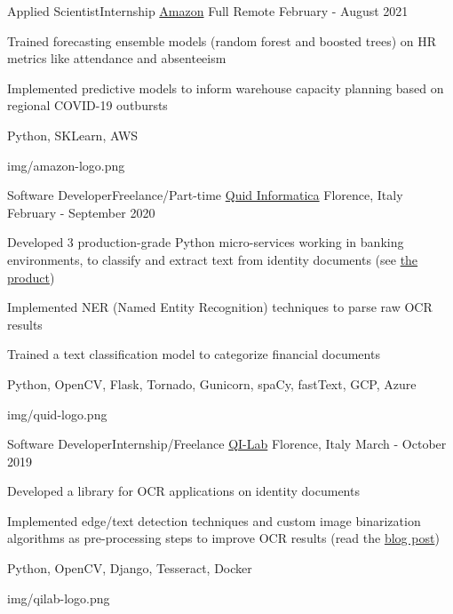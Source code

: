 \begin{cventries}
  \logocventry
    {Applied Scientist{\enskip\cdotp\enskip}Internship}
    {\href{https://www.amazon.com/}{Amazon}}
    {Full Remote}
    {February - August 2021}
    {
      \begin{cvitems}
        \item {Trained forecasting ensemble models (random forest and boosted trees) on HR metrics like attendance and absenteeism}
        \item {Implemented predictive models to inform warehouse capacity planning based on regional COVID-19 outbursts}
      \end{cvitems}
      \cvexptech
        {Python, SKLearn, AWS}
    }
    {img/amazon-logo.png}

  \logocventry
    {Software Developer{\enskip\cdotp\enskip}Freelance/Part-time}
    {\href{https://www.quidinfo.it/}{Quid Informatica}}
    {Florence, Italy}
    {February - September 2020}
    {
      \begin{cvitems}
        \item {Developed 3 production-grade Python micro-services working in banking environments, to classify and extract text from identity documents (see \textcolor{blue}{\href{https://www.youtube.com/watch?v=eyg-UOAdKA8}{the product}})}
        \item {Implemented NER (Named Entity Recognition) techniques to parse raw OCR results}
        \item {Trained a text classification model to categorize financial documents}
      \end{cvitems}
      \cvexptech
        {Python, OpenCV, Flask, Tornado, Gunicorn, spaCy, fastText, GCP, Azure}
    }
    {img/quid-logo.png}
  
  \logocventry
    {Software Developer{\enskip\cdotp\enskip}Internship/Freelance}
    {\href{https://www.qi-lab.it/}{QI-Lab}}
    {Florence, Italy}
    {March - October 2019}
    {
      \begin{cvitems}
        \item {Developed a library for OCR applications on identity documents}
        \item {Implemented edge/text detection techniques and custom image binarization algorithms as pre-processing steps to improve OCR results (read the \textcolor{blue}{\href{https://web.archive.org/web/20210616083923/https://www.qi-lab.it/2019/08/29/tecniche-thresholding-la-binarizzazione-immagini/}{blog post}})}
      \end{cvitems}
      \cvexptech
        {Python, OpenCV, Django, Tesseract, Docker}
    }
    {img/qilab-logo.png}


\end{cventries}

